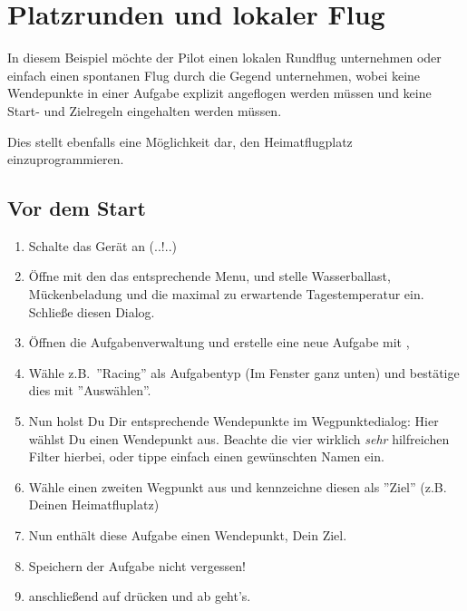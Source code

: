 \section{Platzrunden und lokaler Flug}\label{sec:local-flight}

In diesem Beispiel möchte der Pilot einen lokalen Rundflug unternehmen oder einfach einen spontanen Flug durch die Gegend
unternehmen, wobei keine Wendepunkte in einer Aufgabe explizit angeflogen werden müssen und keine
Start- und Zielregeln eingehalten werden müssen.

Dies stellt ebenfalls eine Möglichkeit dar, den Heimatflugplatz einzuprogrammieren.

\subsection*{Vor dem Start}
\begin{enumerate}
\item  Schalte das Gerät an (..!..)
\item  Öffne mit den  das entsprechende Menu,
und stelle Wasserballast, Mückenbeladung und die maximal zu erwartende  Tagestemperatur ein. Schließe diesen Dialog.
\item  Öffnen die Aufgabenverwaltung   und erstelle eine neue  Aufgabe mit , 
\item  Wähle z.B.\ ''Racing'' als Aufgabentyp (Im Fenster ganz unten) und bestätige dies mit ''Auswählen''.
\item  Nun holst Du Dir entsprechende Wendepunkte im Wegpunktedialog: 
Hier wählst Du einen Wendepunkt aus.  Beachte die vier wirklich \textsl{sehr} hilfreichen Filter
hierbei, oder tippe einfach einen gewünschten Namen ein.
\item Wähle einen zweiten Wegpunkt aus und kennzeichne diesen als ''Ziel''  (z.B. Deinen Heimatfluplatz)
\item Nun enthält diese Aufgabe einen Wendepunkt, Dein Ziel.
\item Speichern der Aufgabe nicht vergessen!
\item anschließend auf  drücken und ab geht's.
\end{enumerate}

